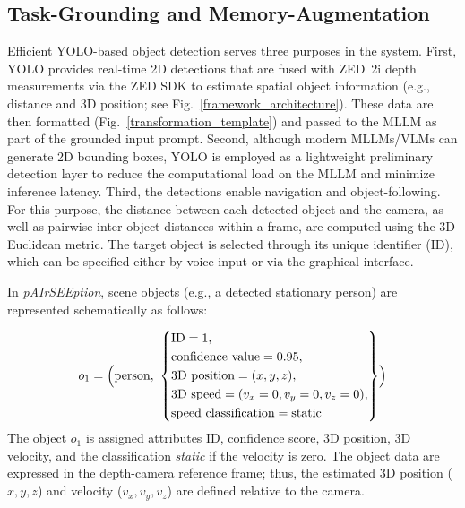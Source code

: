 \documentclass[lettersize,journal]{IEEEtran}
\begin{document}
\subsection{Task-Grounding and Memory-Augmentation} \label{SGmemory}
Efficient YOLO-based object detection serves three purposes in the system. First, YOLO provides real-time 2D detections that are fused with ZED~2i depth measurements via the ZED SDK to estimate spatial object information (e.g., distance and 3D position; see Fig.~\ref{framework_architecture}). These data are then formatted (Fig.~\ref{transformation_template}) and passed to the MLLM as part of the grounded input prompt. Second, although modern MLLMs/VLMs can generate 2D bounding boxes, YOLO is employed as a lightweight preliminary detection layer to reduce the computational load on the MLLM and minimize inference latency. Third, the detections enable navigation and object-following. For this purpose, the distance between each detected object and the camera, as well as pairwise inter-object distances within a frame, are computed using the 3D Euclidean metric. The target object is selected through its unique identifier (ID), which can be specified either by voice input or via the graphical interface.

In \textit{pAIrSEEption}, scene objects (e.g., a detected stationary person) are represented schematically as follows:





\begin{equation}
	\begin{aligned}
		o_1 = \Bigl(\text{person},\ 
		\left\{
		\begin{aligned}
			& \text{ID} = 1, \\
			& \text{confidence value} = 0.95, \\
			& \text{3D position} = (x, y, z), \\
			& \text{3D speed} = (v_x = 0, v_y = 0, v_z = 0), \\
			& \text{speed classification} = \text{static}
		\end{aligned}
		\right\}
		\Bigr)
	\end{aligned}
	\label{eq:o1}
\end{equation}
The object $o_1$ is assigned  attributes ID, confidence score, 3D position, 3D velocity, and the classification \textit{static} if the velocity is zero. The object data are expressed in the depth-camera reference frame; thus, the estimated 3D position ($x,y,z$) and velocity ($v_x,v_y,v_z$) are defined relative to the camera.
\end{document}
